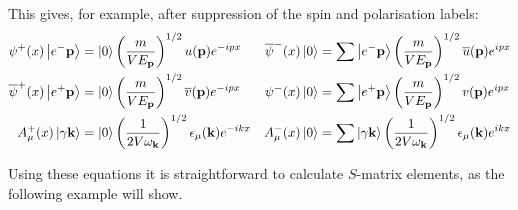 This gives, for example, after suppression of the spin and polarisation labels:
\begin{align*}
\psi^+(x)\left| e^- \bm{\mathrm{p}} \right\rangle &= \left| 0 \right\rangle\left(\frac{m}{VE_{\bm{\mathrm{p}}}}\right)^{1/2}u(\bm{\mathrm{p}})e^{-ipx} & \overline{\psi}^-(x)\left| 0 \right\rangle &= \sum\left| e^-\bm{\mathrm{p}} \right\rangle\left(\frac{m}{VE_{\bm{\mathrm{p}}}}\right)^{1/2}\overline{u}(\bm{\mathrm{p}})e^{ipx} \\
\overline{\psi}^+(x)\left| e^+ \bm{\mathrm{p}} \right\rangle &= \left| 0 \right\rangle\left(\frac{m}{VE_{\bm{\mathrm{p}}}}\right)^{1/2}\overline{v}(\bm{\mathrm{p}})e^{-ipx} & \psi^-(x)\left| 0 \right\rangle &= \sum\left| e^+\bm{\mathrm{p}} \right\rangle\left(\frac{m}{VE_{\bm{\mathrm{p}}}}\right)^{1/2}v(\bm{\mathrm{p}})e^{ipx} \\
A^+_\mu(x)\left| \gamma\bm{\mathrm{k}} \right\rangle &= \left| 0 \right\rangle\left(\frac{1}{2V\omega_{\bm{\mathrm{k}}}}\right)^{1/2}\epsilon_{\mu}(\bm{\mathrm{k}})e^{-ikx} & A^-_\mu(x)\left| 0 \right\rangle &= \sum\left| \gamma\bm{\mathrm{k}} \right\rangle\left(\frac{1}{2V\omega_{\bm{\mathrm{k}}}}\right)^{1/2}\epsilon_{\mu}(\bm{\mathrm{k}})e^{ikx}
\end{align*}

Using these equations it is straightforward to calculate $S$-matrix elements, as the following example will show.

